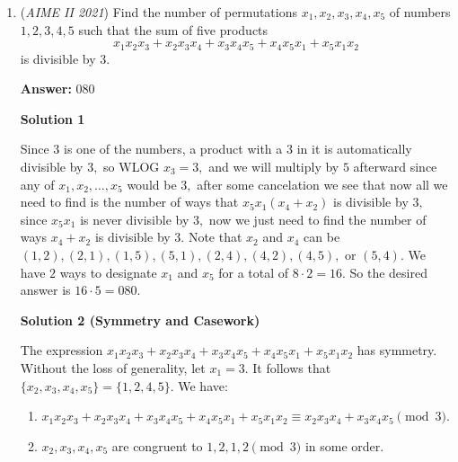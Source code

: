 \begin{enumerate}
 Clearly the only value of x that works is $\boxed{336}$



	\item (\textit{AIME II 2021}) Find the number of permutations $x_1, x_2, x_3, x_4, x_5$ of numbers $1, 2, 3, 4, 5$ such that the sum of five products 
 \[x_1x_2x_3 + x_2x_3x_4 + x_3x_4x_5 + x_4x_5x_1 + x_5x_1x_2\] is divisible by $3$.


 
 \textbf{Answer: }080



\textbf{Solution 1}

Since $3$ is one of the numbers, a product with a $3$ in it is automatically divisible by $3,$ so WLOG $x_3=3,$ and we will multiply by $5$ afterward since any of $x_1, x_2, \ldots, x_5$ would be $3,$ after some cancelation we see that now all we need to find is the number of ways that $x_5x_1(x_4+x_2)$ is divisible by $3,$ since $x_5x_1$ is never divisible by $3,$ now we just need to find the number of ways $x_4+x_2$ is divisible by $3.$ Note that $x_2$ and $x_4$ can be $(1, 2), (2, 1), (1, 5), (5, 1), (2, 4), (4, 2), (4, 5),$ or $(5, 4).$ We have $2$ ways to designate $x_1$ and $x_5$ for a total of $8 \cdot 2 = 16.$ So the desired answer is $16 \cdot 5=\boxed{080}.$




\textbf{Solution 2 (Symmetry and Casework)}

The expression $x_1x_2x_3 + x_2x_3x_4 + x_3x_4x_5 + x_4x_5x_1 + x_5x_1x_2$ has symmetry. Without the loss of generality, let $x_1=3.$ It follows that $\{x_2,x_3,x_4,x_5\}=\{1,2,4,5\}.$ We have:

 
            \begin{enumerate} 
        \item $x_1x_2x_3 + x_2x_3x_4 + x_3x_4x_5 + x_4x_5x_1 + x_5x_1x_2\equiv x_2x_3x_4 + x_3x_4x_5\pmod{3}.$

        \item $x_2,x_3,x_4,x_5$ are congruent to $1,2,1,2\pmod{3}$ in some order.


\end{enumerate}
\end{enumerate}
